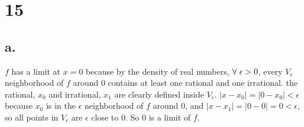 \documentclass[11pt]{article}
\begin{document}
\section*{15}
\subsection*{a.}
$f$ has a limit at $x=0$ because by the density of real numbers, $\forall \hspace{1mm}\epsilon>0$, every $V_{\epsilon}$ neighborhood of $f$ around 0 contains at least one rational and one irrational. the rational, $x_0$ and irrational, $x_1$ are clearly defined inside $V_{\epsilon}$. $|x-x_0| = |0-x_0|< \epsilon$ because $x_0$ is in the $\epsilon$ neighborhood of $f$ around 0, and $|x-x_1|=|0-0|=0 < \epsilon$, so all points in $V_{\epsilon}$ are $\epsilon$ close to 0. So 0 is a limit of $f$.
\end{document}
